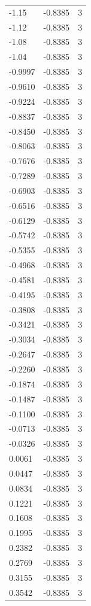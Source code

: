 \begin{longtable}{lrr}
  -1.15 & -0.8385 & 3 \\
  -1.12 & -0.8385 & 3 \\
  -1.08 & -0.8385 & 3 \\
  -1.04 & -0.8385 & 3 \\
  -0.9997 & -0.8385 & 3 \\
  -0.9610 & -0.8385 & 3 \\
  -0.9224 & -0.8385 & 3 \\
  -0.8837 & -0.8385 & 3 \\
  -0.8450 & -0.8385 & 3 \\
  -0.8063 & -0.8385 & 3 \\
  -0.7676 & -0.8385 & 3 \\
  -0.7289 & -0.8385 & 3 \\
  -0.6903 & -0.8385 & 3 \\
  -0.6516 & -0.8385 & 3 \\
  -0.6129 & -0.8385 & 3 \\
  -0.5742 & -0.8385 & 3 \\
  -0.5355 & -0.8385 & 3 \\
  -0.4968 & -0.8385 & 3 \\
  -0.4581 & -0.8385 & 3 \\
  -0.4195 & -0.8385 & 3 \\
  -0.3808 & -0.8385 & 3 \\
  -0.3421 & -0.8385 & 3 \\
  -0.3034 & -0.8385 & 3 \\
  -0.2647 & -0.8385 & 3 \\
  -0.2260 & -0.8385 & 3 \\
  -0.1874 & -0.8385 & 3 \\
  -0.1487 & -0.8385 & 3 \\
  -0.1100 & -0.8385 & 3 \\
  -0.0713 & -0.8385 & 3 \\
  -0.0326 & -0.8385 & 3 \\
  0.0061 & -0.8385 & 3 \\
  0.0447 & -0.8385 & 3 \\
  0.0834 & -0.8385 & 3 \\
  0.1221 & -0.8385 & 3 \\
  0.1608 & -0.8385 & 3 \\
  0.1995 & -0.8385 & 3 \\
  0.2382 & -0.8385 & 3 \\
  0.2769 & -0.8385 & 3 \\
  0.3155 & -0.8385 & 3 \\
  0.3542 & -0.8385 & 3 \\

\end{longtable}

